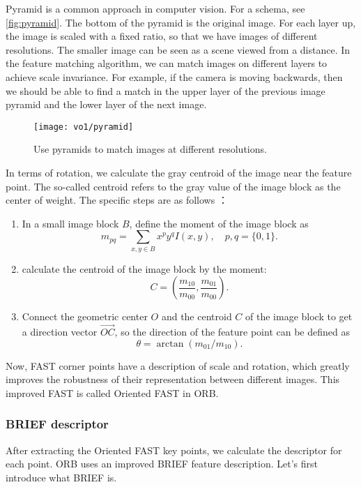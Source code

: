 Pyramid is a common approach in computer vision. For a schema, see \autoref{fig:pyramid}. The bottom of the pyramid is the original image. For each layer up, the image is scaled with a fixed ratio, so that we have images of different resolutions. The smaller image can be seen as a scene viewed from a distance. In the feature matching algorithm, we can match images on different layers to achieve scale invariance. For example, if the camera is moving backwards, then we should be able to find a match in the upper layer of the previous image pyramid and the lower layer of the next image.

\begin{figure}[!t]
    \centering
    \texttt{[image: vo1/pyramid]}\\
    \caption{Use pyramids to match images at different resolutions.}
    \label{fig:pyramid}
\end{figure}

In terms of rotation, we calculate the gray centroid of the image near the feature point. The so-called centroid refers to the gray value of the image block as the center of weight. The specific steps are as follows
\textsuperscript{\cite{Rosin1999}}：
\begin{enumerate}
\item In a small image block $B$, define the moment of the image block as
\[
m_{pq}=\sum_{x,y \in B}x^{p}y^{q}I(x,y), \quad p, q = \{0,1\}.
\]
\item calculate the centroid of the image block by the moment:
\[
C=\left(\frac{m_{10}}{m_{00}},\frac{m_{01}}{m_{00}}\right).
\]
\item Connect the geometric center $O$ and the centroid $C$ of the image block to get a direction vector $\overrightarrow{OC}$, so the direction of the feature point can be defined as
\[
\theta = \arctan(m_{01}/m_{10}).
\]
\end{enumerate}
Now, FAST corner points have a description of scale and rotation, which greatly improves the robustness of their representation between different images. This improved FAST is called Oriented FAST in ORB.

\subsubsection{BRIEF descriptor}
After extracting the Oriented FAST key points, we calculate the descriptor for each point. ORB uses an improved BRIEF feature description. Let's first introduce what BRIEF is.

